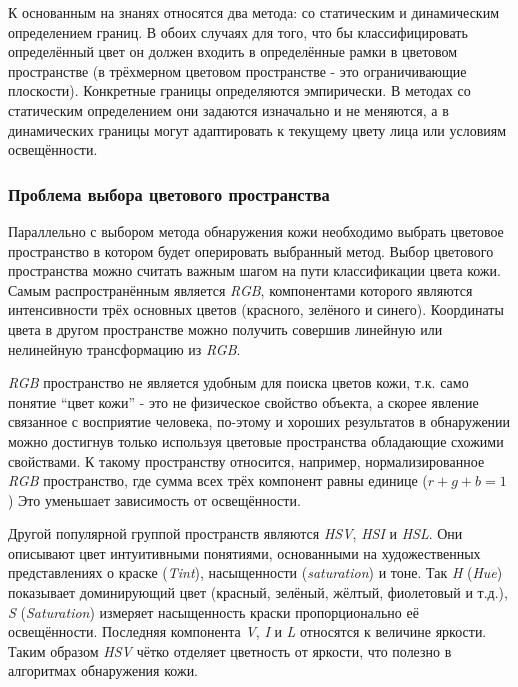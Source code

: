 \documentclass[12pt]{report}
\begin{document}
К основанным на знанях относятся два метода: со статическим и динамическим определением границ. В обоих случаях для 
того, что бы классифицировать определённый цвет он должен входить в определённые рамки в цветовом пространстве (в 
трёхмерном цветовом пространстве - это ограничивающие плоскости). Конкретные границы определяются эмпирически. В 
методах со статическим определением они задаются изначально и не меняются, а в динамических границы могут 
адаптировать к текущему цвету лица или условиям освещённости. 

\subsubsection{Проблема выбора цветового пространства}
Параллельно с выбором метода обнаружения кожи необходимо выбрать цветовое пространство в котором будет оперировать 
выбранный метод. Выбор цветового пространства можно считать важным шагом на пути классификации цвета кожи. Самым 
распространённым является \textit{RGB}, компонентами которого являются интенсивности трёх основных цветов 
(красного, 
зелёного и синего). Координаты цвета в другом пространстве можно получить совершив линейную или нелинейную трансформацию из 
\textit{RGB}. \cite{kakumanu2007survey} 

\textit{RGB} пространство не является удобным для поиска цветов кожи, т.к. само понятие ``цвет кожи'' - это не 
физическое свойство объекта, а скорее явление связанное с восприятие человека, по-этому и хороших результатов в 
обнаружении можно достигнув только используя цветовые пространства обладающие схожими свойствами. К такому 
пространству относится, например, нормализированное \textit{RGB} пространство, где сумма всех трёх компонент равны единице 
($r
+g+b=1$) Это уменьшает зависимость от освещённости. \citep{vezhnevets2003survey}

Другой популярной группой пространств являются \textit{HSV}, \textit{HSI} и \textit{HSL}. Они описывают цвет 
интуитивными понятиями, основанными на художественных представлениях о краске (\textit{Tint}), насыщенности (\textit
{saturation}) и тоне. Так \textit{H} (\textit{Hue}) показывает доминирующий цвет (красный, зелёный, жёлтый, 
фиолетовый 
и т.д.), \textit{S} (\textit{Saturation}) измеряет насыщенность краски пропорционально её 
освещённости. 
Последняя компонента \textit{V}, \textit{I} и \textit{L} относятся к величине яркости. Таким образом \textit{HSV} 
чётко отделяет цветность от яркости, что полезно в алгоритмах обнаружения кожи. \citep{vezhnevets2003survey}
\end{document}
